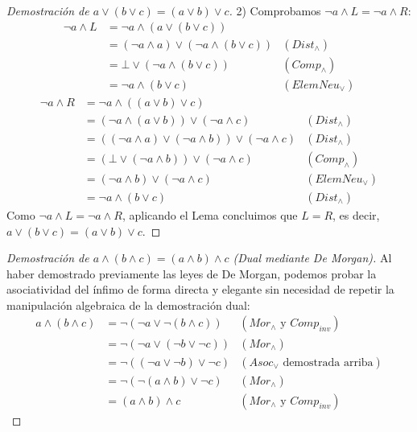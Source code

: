 \documentclass[12pt,a4paper]{article}
\begin{document}
{\begin{proof}[Demostración de $a \vee (b \vee c) = (a \vee b) \vee c$]
2) Comprobamos $\neg a \wedge L = \neg a \wedge R$:
\begin{align*}
    \neg a \wedge L &= \neg a \wedge (a \vee (b \vee c)) \\
                    &= (\neg a \wedge a) \vee (\neg a \wedge (b \vee c)) & (Dist_\wedge) \\
                    &= \bot \vee (\neg a \wedge (b \vee c)) & (Comp_\wedge) \\
                    &= \neg a \wedge (b \vee c) & (ElemNeu_\vee)
\end{align*}
\begin{align*}
    \neg a \wedge R &= \neg a \wedge ((a \vee b) \vee c) \\
                    &= (\neg a \wedge (a \vee b)) \vee (\neg a \wedge c) & (Dist_\wedge) \\
                    &= ((\neg a \wedge a) \vee (\neg a \wedge b)) \vee (\neg a \wedge c) & (Dist_\wedge) \\
                    &= (\bot \vee (\neg a \wedge b)) \vee (\neg a \wedge c) & (Comp_\wedge) \\
                    &= (\neg a \wedge b) \vee (\neg a \wedge c) & (ElemNeu_\vee) \\
                    &= \neg a \wedge (b \vee c) & (Dist_\wedge)
\end{align*}
Como $\neg a \wedge L = \neg a \wedge R$, aplicando el Lema concluimos que $L = R$, es decir, $a \vee (b \vee c) = (a \vee b) \vee c$.
\end{proof}

\begin{proof}[Demostración de $a \wedge (b \wedge c) = (a \wedge b) \wedge c$ (Dual mediante De Morgan)]
Al haber demostrado previamente las leyes de De Morgan, podemos probar la asociatividad del ínfimo de forma directa y elegante sin necesidad de repetir la manipulación algebraica de la demostración dual:
\begin{align*}
    a \wedge (b \wedge c) &= \neg (\neg a \vee \neg (b \wedge c)) & (Mor_\wedge \text{ y } Comp_{inv}) \\
                          &= \neg (\neg a \vee (\neg b \vee \neg c)) & (Mor_\wedge) \\
                          &= \neg ((\neg a \vee \neg b) \vee \neg c) & (Asoc_\vee \text{ demostrada arriba}) \\
                          &= \neg (\neg (a \wedge b) \vee \neg c) & (Mor_\wedge) \\
                          &= (a \wedge b) \wedge c & (Mor_\wedge \text{ y } Comp_{inv})
\end{align*}
\end{proof}
}
\end{document}
